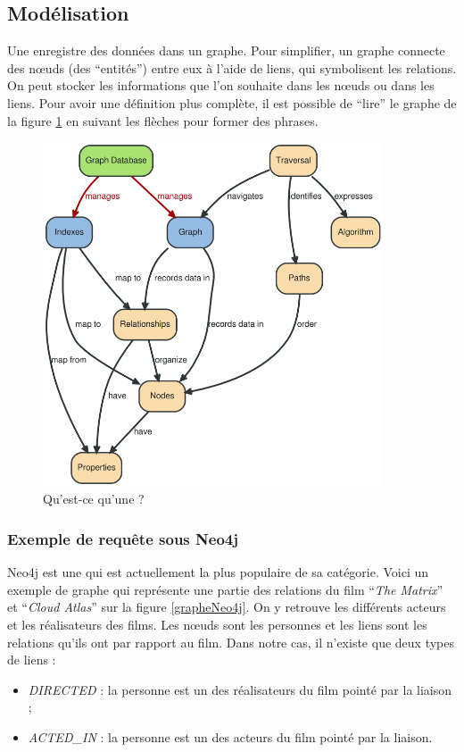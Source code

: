 \subsection{Modélisation}
	Une \bddGraphe{} enregistre des données dans un graphe. Pour simplifier, un graphe connecte des nœuds (des \enquote{entités}) entre eux à l'aide de liens, qui symbolisent les relations. On peut stocker les informations que l'on souhaite dans les nœuds ou dans les liens. Pour avoir une définition plus complète, il est possible de \enquote{lire} le graphe de la figure \ref{bddGrapheSVG} en suivant les flèches pour former des phrases.

	\begin{figure}[H]
		\centering
		\includegraphics[width=0.9\textwidth]{images/bddGraphe.png}
		\caption{Qu'est-ce qu'une \bddGraphe{} ? \cite{bddGrapheSchema}}
		\label{bddGrapheSVG}
	\end{figure}

	\subsubsection{Exemple de requête sous Neo4j}
		Neo4j est une \bddGraphe{} qui est actuellement la plus populaire de sa catégorie. Voici un exemple de graphe qui représente une partie des relations du film \enquote{\textit{The Matrix}} et \enquote{\textit{Cloud Atlas}} sur la figure \ref{grapheNeo4j}. On y retrouve les différents acteurs et les réalisateurs des films. Les nœuds sont les personnes et les liens sont les relations qu'ils ont par rapport au film. Dans notre cas, il n'existe que deux types de liens :
		\vspace{5px}
		\begin{itemize}
			\item \textit{DIRECTED} : la personne est un des réalisateurs du film pointé par la liaison ; 
			\item \textit{ACTED\_IN} : la personne est un des acteurs du film pointé par la liaison. 
		\end{itemize}

